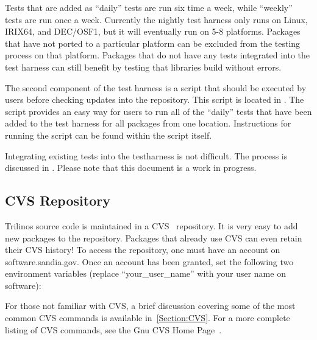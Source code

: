 \documentclass[12pt,strict]{TrilinosDevGuide}
\begin{document}
Tests that are added as ``daily'' tests are run six time a week, while 
``weekly'' tests are run once a week.  Currently the nightly test harness only 
runs on Linux, IRIX64, and DEC/OSF1, but it will eventually run on 5-8 
platforms.  Packages that have not ported to a particular platform can be 
excluded from the testing process on that platform.  Packages that do not have 
any tests integrated into the test harness can still benefit by testing that 
libraries build without errors.  

The second component of the test harness is a script that should be executed 
by users before checking updates into the repository.  This script is located 
in .  The script 
provides an easy way for users to run all of the ``daily'' tests that have 
been added to the test harness for all packages from one location.  
Instructions for running the script can be found within the script itself.

Integrating existing tests into the testharness is not difficult.  
The process is discussed in 
.  
Please note that this document is a work in progress.

\subsection{CVS Repository}

Trilinos source code is maintained in a CVS~\cite{CVS} repository.  It is 
very easy to add new packages to the repository.  Packages that already use 
CVS can even retain their CVS history!  To access the repository, one must 
have an account on software.sandia.gov.  Once an account has been granted, 
set the following two environment variables (replace ``your\_user\_name'' 
with your user name on software):


For those not familiar with CVS, a brief discussion covering some of the most 
common CVS commands is available in~\ref{Section:CVS}.  For a more complete 
listing of CVS commands, see the Gnu CVS Home Page~\cite{CVS}.
\end{document}
